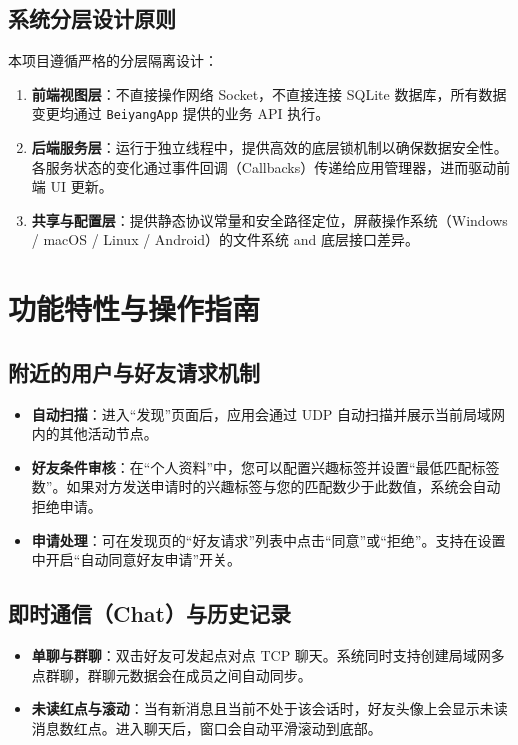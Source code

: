 \documentclass[UTF8]{ctexart}
\begin{document}
\subsection{系统分层设计原则}
本项目遵循严格的分层隔离设计：
\begin{enumerate}
    \item \textbf{前端视图层}：不直接操作网络 Socket，不直接连接 SQLite 数据库，所有数据变更均通过 \texttt{BeiyangApp} 提供的业务 API 执行。
    \item \textbf{后端服务层}：运行于独立线程中，提供高效的底层锁机制以确保数据安全性。各服务状态的变化通过事件回调（Callbacks）传递给应用管理器，进而驱动前端 UI 更新。
    \item \textbf{共享与配置层}：提供静态协议常量和安全路径定位，屏蔽操作系统（Windows / macOS / Linux / Android）的文件系统 and 底层接口差异。
\end{enumerate}

\section{功能特性与操作指南}

\subsection{附近的用户与好友请求机制}
\begin{itemize}
    \item \textbf{自动扫描}：进入“发现”页面后，应用会通过 UDP 自动扫描并展示当前局域网内的其他活动节点。
    \item \textbf{好友条件审核}：在“个人资料”中，您可以配置兴趣标签并设置“最低匹配标签数”。如果对方发送申请时的兴趣标签与您的匹配数少于此数值，系统会自动拒绝申请。
    \item \textbf{申请处理}：可在发现页的“好友请求”列表中点击“同意”或“拒绝”。支持在设置中开启“自动同意好友申请”开关。
\end{itemize}

\subsection{即时通信（Chat）与历史记录}
\begin{itemize}
    \item \textbf{单聊与群聊}：双击好友可发起点对点 TCP 聊天。系统同时支持创建局域网多点群聊，群聊元数据会在成员之间自动同步。
    \item \textbf{未读红点与滚动}：当有新消息且当前不处于该会话时，好友头像上会显示未读消息数红点。进入聊天后，窗口会自动平滑滚动到底部。
\end{itemize}
\end{document}
